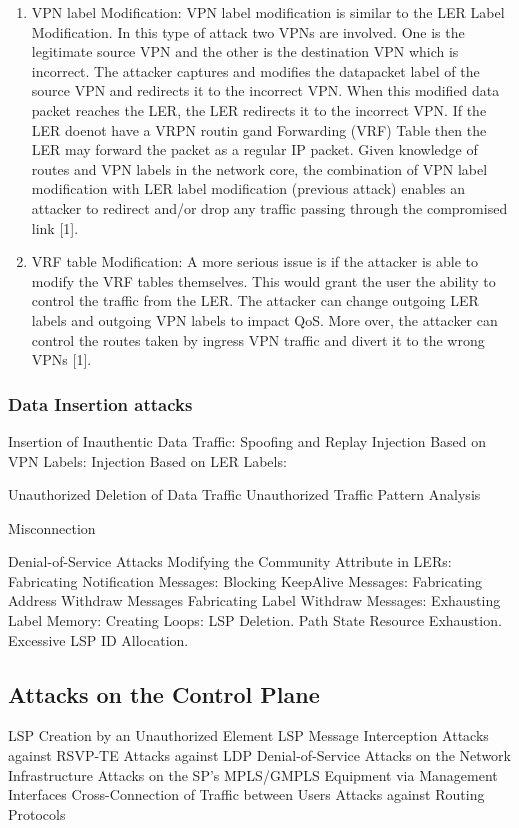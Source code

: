 \begin{enumerate}
\item VPN label Modification:
VPN label modification is similar to the LER Label Modification. In this type of attack two VPNs are involved. One is the legitimate source VPN and the other is the destination VPN which is incorrect. The attacker captures and modifies the datapacket label of the source VPN and redirects it to the incorrect VPN. When this modified data packet reaches the LER, the LER redirects it to the incorrect VPN. If the LER doenot have a VRPN routin gand Forwarding (VRF) Table then the LER may forward the packet as a regular IP packet. Given knowledge of routes and VPN labels in the network core, the combination of VPN label modification with LER label modification (previous attack) enables an attacker to redirect and/or drop any traffic passing through the compromised link [1].

\item VRF table Modification:
A more serious issue is if the attacker is able to modify the VRF tables themselves. This would grant the user the ability to control the traffic from the LER. The attacker can change outgoing LER labels and outgoing VPN labels to impact QoS. More over, the attacker can control the routes taken by ingress VPN traffic and divert it to the wrong VPNs [1].
\end{enumerate}

\subsubsection{Data Insertion attacks}
    	Insertion of Inauthentic Data Traffic: Spoofing and Replay
    	Injection Based on VPN Labels:
    	Injection Based on LER Labels:
        
    Unauthorized Deletion of Data Traffic
    Unauthorized Traffic Pattern Analysis
               
    Misconnection
    
    Denial-of-Service Attacks
    	Modifying the Community Attribute in LERs:
    	Fabricating Notification Messages:
    	Blocking KeepAlive Messages:
    	Fabricating Address Withdraw Messages
    	Fabricating Label Withdraw Messages:
    	Exhausting Label Memory:
    	Creating Loops:
    	LSP Deletion.
    	Path State Resource Exhaustion.
    	Excessive LSP ID Allocation.

\subsection{Attacks on the Control Plane}
	LSP Creation by an Unauthorized Element
    LSP Message Interception
    Attacks against RSVP-TE
    Attacks against LDP
    Denial-of-Service Attacks on the Network Infrastructure
    Attacks on the SP’s MPLS/GMPLS Equipment via Management Interfaces
    Cross-Connection of Traffic between Users
    Attacks against Routing Protocols
    
